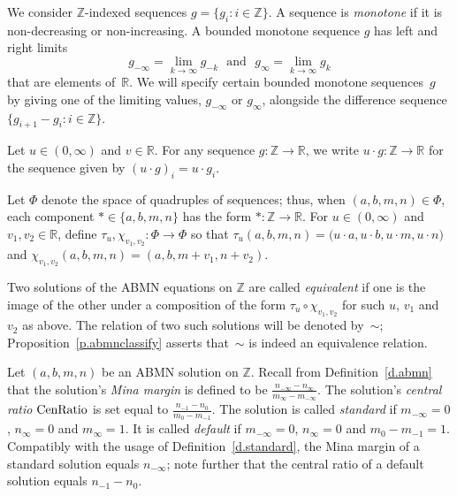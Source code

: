 \documentclass[letterpaper,11pt,oneside,reqno]{amsbook}
\newcommand{\R}{\ensuremath{\mathbb{R}}}
\newcommand{\Z}{\ensuremath{\mathbb{Z}}}
\numberwithin{figure}{chapter}
\theoremstyle{definition}
\theoremstyle{definition}
\theoremstyle{definition}
\theoremstyle{definition}
\theoremstyle{definition}
\newcommand{\centralratio}{{\rm CenRatio}}
\newcommand{\genseq}{g}
\newcommand{\transmap}{\chi}
\newcommand{\PhiMac}{\Phi}
\newcommand{\abmnmacspace}{\textrm{ABMN} }
\def\hfff#1{\label{#1}}
\begin{document}
We consider $\Z$-indexed sequences $\genseq = \{ \genseq_i: i \in \Z \}$. A sequence is {\em monotone} if it is non-decreasing or non-increasing. A bounded monotone sequence $\genseq$
has left and right limits 
$$
\genseq_{-\infty} = \lim_{k \to \infty} \genseq_{-k} \, \, \, \,  \textrm{and} \, \, \, \,  \genseq_\infty = \lim_{k \to \infty} \genseq_k
$$ 
that are elements of~$\R$. We will specify certain bounded monotone sequences~$\genseq$ by giving one of the limiting values, $\genseq_{-\infty}$ or $\genseq_\infty$, alongside the difference sequence $\big\{ \genseq_{i+1} - \genseq_i: i \in \Z \big\}$.

Let $u \in (0,\infty)$ and $v \in \R$. For any sequence $g:\Z \to \R$, we write $u \cdot g:\Z \to \R$ for the sequence given by $(u \cdot g)_i = u \cdot g_i$.

Let $\PhiMac$ denote the space of quadruples of sequences; thus, when $(a,b,m,n) \in \PhiMac$, each component $* \in \{ a,b,m,n \}$ has the form $*:\Z \to \R$. For $u \in (0,\infty)$ and $v_1,v_2 \in \R$, define 
$\tau_u,\transmap_{v_1,v_2}:\PhiMac \to \PhiMac$ so that $\tau_u(a,b,m,n) = \big( u \cdot a,  u \cdot b, u \cdot m, u \cdot n \big)$ and $\transmap_{v_1,v_2}(a,b,m,n) = (a,b,m+v_1,n+v_2)$.

Two solutions of the \abmnmacspace equations on $\Z$ are called {\em equivalent} if one is the image of the other under a composition of the form $\tau_u \circ \transmap_{v_1,v_2}$ for such $u$, $v_1$ and $v_2$ as above. The relation of two such solutions will be denoted by~$\sim$; Proposition~\ref{p.abmnclassify} asserts that~$\sim$ is indeed an equivalence relation.

Let $(a,b,m,n)$ be an \abmnmacspace solution on $\Z$. Recall from Definition~\ref{d.abmn} that the solution's {\em Mina margin}\hfff{centralratio} is defined to be $\tfrac{n_{-\infty} - n_\infty}{m_\infty - m_{-\infty}}$. 
The solution's {\em central ratio}\hfff{centralratio} $\centralratio$ is set equal to $\frac{n_{-1} - n_0}{m_0 - m_{-1}}$. The solution\hfff{standarddefault} is called 
 {\em standard} if $m_{-\infty} = 0$, $n_\infty = 0$ and $m_\infty = 1$.  It is called  {\em default} if  $m_{-\infty} = 0$, $n_\infty = 0$ and $m_0 - m_{-1} = 1$. 
 Compatibly with the usage of Definition~\ref{d.standard}, the Mina margin of a standard solution equals $n_{-\infty}$; note further that the central ratio of a default solution equals $n_{-1} - n_0$.
\end{document}
